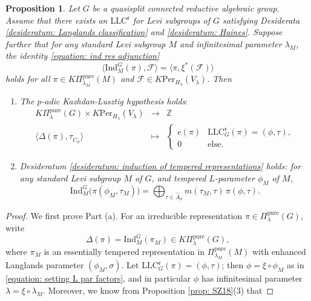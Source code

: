 \documentclass[11pt,letterpaper]{amsart}
\newcommand{\irrepdual}[1]{\widehat{#1}}
\newcommand{\pure}{\mathrm{pure}}
\newcommand{\Ind}{\mathrm{Ind}}
\newcommand{\LLC}{\mathrm{LLC}}
\newcommand{\Per}{\mathrm{Per}}
\newtheorem{prop}[thm]{Proposition}
\renewcommand{\1}{\mathbbm{1}}
\numberwithin{equation}{section}
\begin{document}
{\begin{prop}\label{theorem: ind res adjunction implies klh}
Let $G$ be a quasisplit connected reductive algebraic group.  Assume that there exists an $\LLC^{\mathfrak{e}}$ for Levi subgroups of $G$ satisfying Desiderata \ref{desideratum: Langlands classification} and \ref{desideratum: Haines}. Suppose further that for any standard Levi subgroup $M$ and infinitesimal parameter $\lambda_M$, the identity \eqref{equation: ind res adjunction}
\[\langle \Ind_M^G(\pi),\mathcal{F}\rangle=\langle \pi, \xi^*(\mathcal{F})\rangle  \]
holds for all $\pi \in K\Pi_{\lambda_M}^{\pure}(M)$ and $\mathcal{F} \in K \Per_{H_{\lambda}}(V_{\lambda
})$. Then
\begin{enumerate}
    \item [(a)] The $p$-adic Kazhdan-Lusztig hypothesis holds$:$ 
\begin{equation*}
    \begin{array}{rcl}
        K\Pi_\lambda^\pure(G) \times K\Per_{H_\lambda}(V_\lambda)
            &\to& \mathbb{Z}\\
        \langle \Delta(\pi), \tau_{C_{\phi}}^{} \rangle 
            &\mapsto& 
            \begin{cases}
                e(\pi) & \LLC^{\mathfrak{e}}_G(\pi) = (\phi,\tau), \\
                0 & \text{else}.
            \end{cases}
    \end{array}
\end{equation*}
    \item [(b)]  Desideratum \ref{desideratum: induction of tempered representations} holds: for any standard Levi subgroup $M$ of $G$, and tempered $L$-parameter $\phi_M$ of $M$,
    \[\Ind_{M}^{G} \big(\pi(\phi_M,\tau_M)\big)=\bigoplus_{\tau \in \irrepdual{A}_{\phi}} m(\tau_M, \tau)\, \pi(\phi, \tau).\]
\end{enumerate}
\end{prop}
\begin{proof}
We first prove Part (a).   For an irreducible representation $\pi \in \Pi_{\lambda}^\pure(G)$, write 
    \[\Delta(\pi)=\Ind_M^G(\pi_M) \in K\Pi_{\lambda}^\pure(G),\]
    where $\pi_M$ is an essentially tempered representation in $\Pi_{\lambda_M}^\pure(M)$ with enhanced Langlands parameter $(\phi_M, \sigma)$.  Let $\LLC_G^{\mathfrak{e}}(\pi)=(\phi,\tau)$; then $\phi=\xi\circ\phi_M$ as in \eqref{equation: setting L par factors}, and in particular $\phi$ has infinitesimal parameter $\lambda= \xi \circ \lambda_M$. Moreover, we know from Proposition \ref{prop: SZ18}(3) that 

\end{proof}}
\end{document}
